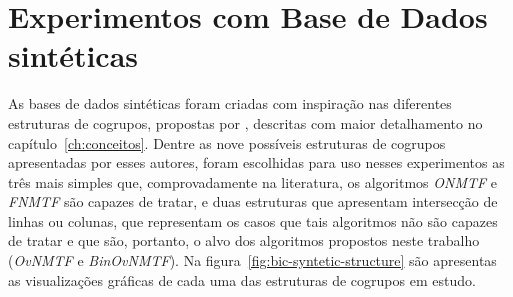 \documentclass[
    12pt,                %
    oneside,            %
    a4paper,            %
    english,            %
    brazil                %
    ]{abntex2ppgsi}
\begin{document}
\section{Experimentos com Base de Dados sintéticas}



As bases de dados sintéticas foram criadas com inspiração nas diferentes estruturas de cogrupos, propostas por , descritas com maior detalhamento no capítulo~\ref{ch:conceitos}. Dentre as nove possíveis estruturas de cogrupos apresentadas por esses autores, foram escolhidas para uso nesses experimentos as três mais simples que, comprovadamente na literatura, os algoritmos \textit{ONMTF} e \textit{FNMTF} são capazes de tratar, e duas estruturas que apresentam intersecção de linhas ou colunas, que representam os casos que tais algoritmos não são capazes de tratar e que são, portanto, o alvo dos algoritmos propostos neste trabalho (\textit{OvNMTF} e \textit{BinOvNMTF}). Na figura~\ref{fig:bic-syntetic-structure} são apresentas as visualizações gráficas de cada uma das estruturas de cogrupos em estudo.
\end{document}
